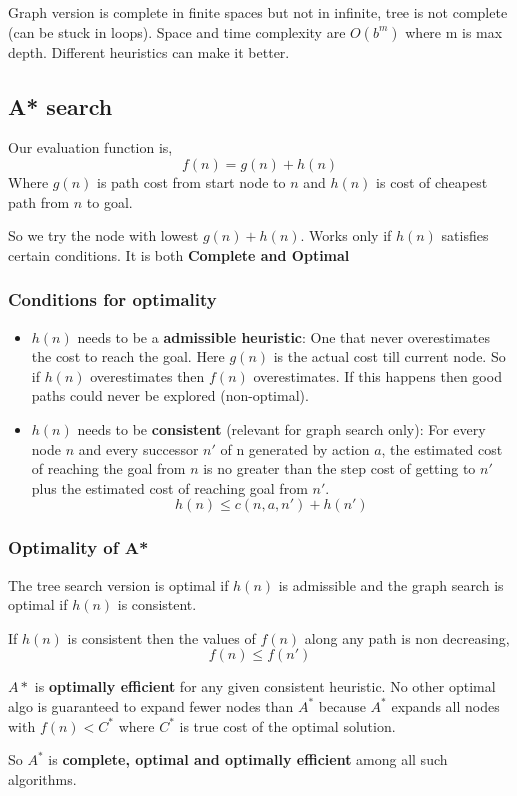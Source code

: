 Graph version is complete in finite spaces but not in infinite, tree is not complete (can be stuck in loops). Space and time complexity are $O(b^{m})$ where m is max depth. Different heuristics can make it better.

\subsection{A* search}
Our evaluation function is, 
$$ f(n) = g(n) + h(n) $$ 
Where $g(n)$ is path cost from start node to $n$ and $h(n)$ is cost of cheapest path from $n$ to goal.

So we try the node with lowest $g(n) + h(n)$. Works only if $h(n)$ satisfies certain conditions. It is both \textbf{Complete and Optimal}

\subsubsection{Conditions for optimality}
\begin{itemize}
    \item $h(n)$ needs to be a \textbf{admissible heuristic}: One that never overestimates the cost to reach the goal.  Here $g(n)$ is the actual cost till current node. So if $h(n)$ overestimates then $f(n)$ overestimates. If this happens then good paths could never be explored (non-optimal).
    \item $h(n)$ needs to be \textbf{consistent} (relevant for graph search only): For every node $n$ and every successor $n'$ of n generated by action $a$, the estimated cost of reaching the goal from $n$ is no greater than the step cost of getting to $n'$ plus the estimated cost of reaching goal from $n'$.
    $$ h(n) \le c(n,a,n') + h(n') $$ 
\end{itemize}

\subsubsection{Optimality of A*}
The tree search version is optimal if $h(n)$ is admissible and the graph search is optimal if $h(n)$ is consistent.

If $h(n)$ is consistent then the values of $f(n)$ along any path is non decreasing, 
$$ f(n) \le f(n') $$ 


$A*$ is \textbf{optimally efficient} for any given consistent heuristic. No other optimal algo is guaranteed to expand fewer nodes than $A^{*}$ because $A^{*}$ expands all nodes with $f(n) < C^{*}$ where $C^{*}$ is true cost of the optimal solution.

So $A^{*}$ is \textbf{complete, optimal and optimally efficient}  among all such algorithms.



